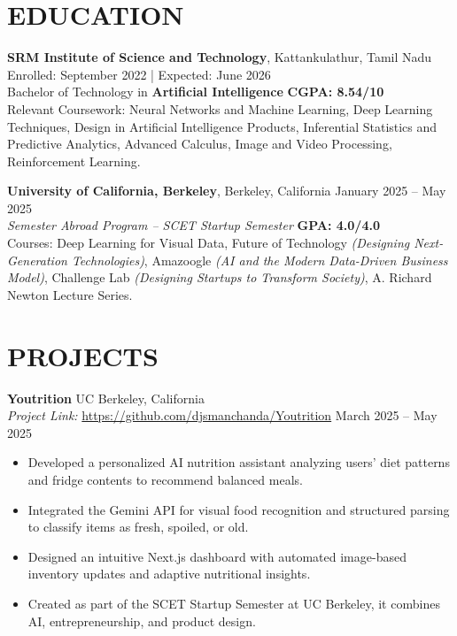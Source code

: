 \documentclass[a4paper,9pt]{extarticle}
\begin{document}
\section*{EDUCATION}
\noindent
\textbf{SRM Institute of Science and Technology}, Kattankulathur, Tamil Nadu \hfill Enrolled: September 2022 | Expected: June 2026\\ %
Bachelor of Technology in \textbf{Artificial Intelligence} \hfill \textbf{CGPA: 8.54/10}\\[0.15em]
Relevant Coursework: Neural Networks and Machine Learning, Deep Learning Techniques, Design in Artificial Intelligence Products, Inferential Statistics and Predictive Analytics, Advanced Calculus, Image and Video Processing, Reinforcement Learning.

\vspace{0.5em}\noindent
\textbf{University of California, Berkeley}, Berkeley, California \hfill January 2025 – May 2025\\
\textit{Semester Abroad Program – SCET Startup Semester} \hfill \textbf{GPA: 4.0/4.0}\\[0.15em]
Courses: Deep Learning for Visual Data, Future of Technology \textit{(Designing Next-Generation Technologies)}, Amazoogle \textit{(AI and the Modern Data-Driven Business Model)}, Challenge Lab \textit{(Designing Startups to Transform Society)}, A. Richard Newton Lecture Series.

\section*{PROJECTS}

\noindent
\textbf{Youtrition} \hfill UC Berkeley, California\\
\textit{Project Link:} \url{https://github.com/djsmanchanda/Youtrition} \hfill March 2025 – May 2025
\begin{itemize}
    \item Developed a personalized AI nutrition assistant analyzing users’ diet patterns and fridge contents to recommend balanced meals.
    \item Integrated the Gemini API for visual food recognition and structured parsing to classify items as fresh, spoiled, or old.
    \item Designed an intuitive Next.js dashboard with automated image-based inventory updates and adaptive nutritional insights.
    \item Created as part of the SCET Startup Semester at UC Berkeley, it combines AI, entrepreneurship, and product design.
\end{itemize}
\end{document}
